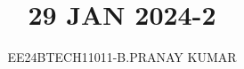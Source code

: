 \documentclass[journal]{IEEEtran}
\begin{document}

\vspace{3cm}

\title{29 JAN 2024-2}
\author{EE24BTECH11011-B.PRANAY KUMAR
}
 \maketitle
{\let\newpage\relax\maketitle}

\renewcommand{\thefigure}{\theenumi}
\renewcommand{\thetable}{\theenumi}
\setlength{\intextsep}{10pt} %


\renewcommand{\thetable}{\theenumi}
\end{document}

